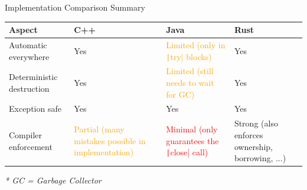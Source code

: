 \begin{frame}{Implementation Comparison Summary}

	\begin{table}
		\centering
		\renewcommand{\arraystretch}{1.3}
		\begin{tabular}{l p{3cm} p{3cm} p{3cm}}
			\textbf{Aspect} & \textbf{C++}                                                                   & \textbf{Java} & \textbf{Rust} \\ \hline

			Automatic everywhere
			                & \textcolor{green!60!black}{Yes}
			                & \textcolor{orange}{Limited (only in \texttt|try| blocks)}
			                & \textcolor{green!60!black}{Yes}                                                                                \\

			Deterministic destruction
			                & \textcolor{green!60!black}{Yes}
			                & \textcolor{orange}{Limited (still needs to wait for GC)}
			                & \textcolor{green!60!black}{Yes}                                                                                \\

			Exception safe
			                & \textcolor{green!60!black}{Yes}
			                & \textcolor{green!60!black}{Yes}
			                & \textcolor{green!60!black}{Yes}                                                                                \\

			Compiler enforcement
			                & \textcolor{orange}{Partial (many mistakes possible in implementation)}
			                & \textcolor{red}{Minimal (only guarantees the \texttt|close{}| call)}
			                & \textcolor{green!60!black}{Strong (also enforces ownership, borrowing, ...)}                                   \\
		\end{tabular}
	\end{table}

	\vspace{0.5em}
	\footnotesize
	\textit{* GC = Garbage Collector}
\end{frame}
